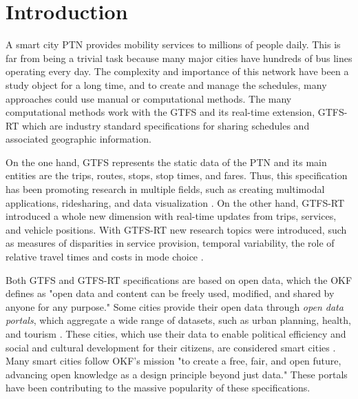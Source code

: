 \chapter{Introduction}
\label{cap1}

\vspace{-1.9cm}


A smart city \ac{PTN} provides mobility services to
millions of people daily. This is far from being a trivial task because many major cities have hundreds of bus lines operating every day.
The complexity and importance of this network
have been a study object for a long time, and to create and 
manage the schedules, many approaches could use
manual or computational methods. 
The many computational 
methods work with the \ac{GTFS} \cite{GTFS}
and its real-time extension, 
\ac{GTFS-RT} \cite{GTFS-RT}
which are industry standard specifications for sharing schedules and
associated geographic information.

On the one hand, GTFS represents the static data of the PTN and its 
main entities are the trips, routes, stops, stop times, and fares. 
Thus, this specification has been promoting research in multiple fields, 
such as creating multimodal applications, 
ridesharing, and data visualization 
\cite{GTFSExemples}.
On the other hand, GTFS-RT introduced
a whole new dimension with real-time updates from trips,
services, and vehicle positions. With GTFS-RT new research topics were introduced, such as measures of disparities in service provision, temporal
variability, the role of relative travel times and costs in mode choice
\cite{GTFS-RT_delays_2017, GTFS-RT_delays_2022, GTFS-RT_delays_2022-ADWIN}.

Both GTFS and GTFS-RT specifications are based on open data, which
the \ac{OKF} \cite{okf} defines as
"open data and content can be freely used, modified, 
and shared by anyone for any purpose." Some cities provide
their open data through {\em open data portals}, which aggregate
a wide range of
datasets, such as urban planning, health, and tourism \cite{opendata}.
These cities, which use their data to enable political efficiency and social and 
cultural development for their citizens, are considered smart cities \cite{smart_cities_SLR}.
Many smart cities follow OKF's mission "to create a free, fair, and open future, advancing open knowledge 
as a design principle beyond just data." These portals have been contributing
to the massive popularity of these specifications.

